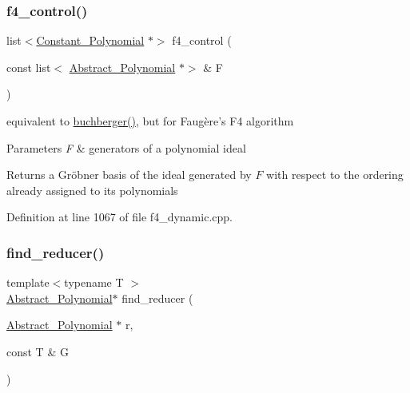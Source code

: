 \mbox{\label{group___g_b_computation_ga24647e1e20f18283bc931e723ba9fc22}} 
\subsubsection{\texorpdfstring{f4\+\_\+control()}{f4\_control()}}
{\footnotesize\ttfamily list$<$\hyperlink{group__polygroup_class_constant___polynomial}{Constant\+\_\+\+Polynomial} $\ast$$>$ f4\+\_\+control (\begin{DoxyParamCaption}\item[{const list$<$ \hyperlink{group__polygroup_class_abstract___polynomial}{Abstract\+\_\+\+Polynomial} $\ast$$>$ \&}]{F }\end{DoxyParamCaption})}



equivalent to {\ttfamily \hyperlink{group___g_b_computation_ga37aa7e2fec96fac6c914934a4243f603}{buchberger()}}, but for Faug\`{e}re's F4 algorithm 


\begin{DoxyParams}{Parameters}
{\em F} & generators of a polynomial ideal \\
\hline
\end{DoxyParams}
\begin{DoxyReturn}{Returns}
a Gr\"{o}bner basis of the ideal generated by $ F $ with respect to the ordering already assigned to its polynomials 
\end{DoxyReturn}


Definition at line 1067 of file f4\+\_\+dynamic.\+cpp.

\mbox{\label{group___g_b_computation_ga5a0f37dcb4ac73e553793fd627941c48}} 
\subsubsection{\texorpdfstring{find\+\_\+reducer()}{find\_reducer()}}
{\footnotesize\ttfamily template$<$typename T $>$ \\
\hyperlink{group__polygroup_class_abstract___polynomial}{Abstract\+\_\+\+Polynomial}$\ast$ find\+\_\+reducer (\begin{DoxyParamCaption}\item[{\hyperlink{group__polygroup_class_abstract___polynomial}{Abstract\+\_\+\+Polynomial} $\ast$}]{r,  }\item[{const T \&}]{G }\end{DoxyParamCaption})}



